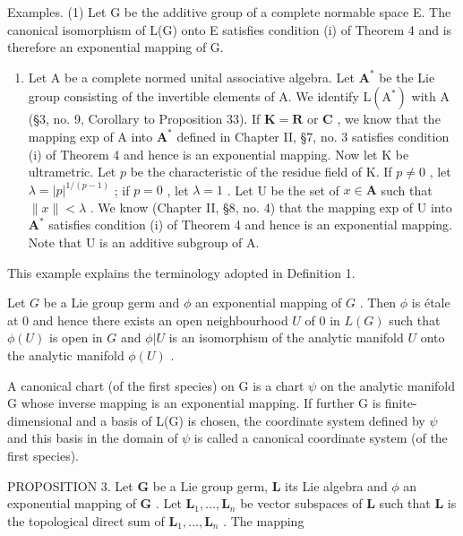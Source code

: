 Examples. (1) Let G be the additive group of a complete normable space E. The canonical isomorphism of L(G) onto E satisfies condition (i) of Theorem 4 and is therefore an exponential mapping of G.

\begin{enumerate}
\def\labelenumi{(\arabic{enumi})}
\setcounter{enumi}{1}
\tightlist
\item
  Let A be a complete normed unital associative algebra. Let \(\mathbf{A}^*\) be the Lie group consisting of the invertible elements of A. We identify \(\mathrm{L}(\mathrm{A}^*)\) with A (§3, no. 9, Corollary to Proposition 33). If \(\mathbf{K} = \mathbf{R}\) or \(\mathbf{C}\) , we know that the mapping exp of A into \(\mathbf{A}^*\) defined in Chapter II, §7, no. 3 satisfies condition (i) of Theorem 4 and hence is an exponential mapping. Now let K be ultrametric. Let \(p\) be the characteristic of the residue field of K. If \(p \neq 0\) , let \(\lambda = |p|^{1/(p-1)}\) ; if \(p = 0\) , let \(\lambda = 1\) . Let U be the set of \(x \in \mathbf{A}\) such that \(\|x\| < \lambda\) . We know (Chapter II, §8, no. 4) that the mapping exp of U into \(\mathbf{A}^*\) satisfies condition (i) of Theorem 4 and hence is an exponential mapping. Note that U is an additive subgroup of A.
\end{enumerate}

This example explains the terminology adopted in Definition 1.

Let \(G\) be a Lie group germ and \(\phi\) an exponential mapping of \(G\) . Then \(\phi\) is étale at 0 and hence there exists an open neighbourhood \(U\) of 0 in \(L(G)\) such that \(\phi(U)\) is open in \(G\) and \(\phi|U\) is an isomorphism of the analytic manifold \(U\) onto the analytic manifold \(\phi(U)\) .

A canonical chart (of the first species) on G is a chart \(\psi\) on the analytic manifold G whose inverse mapping is an exponential mapping. If further G is finite-dimensional and a basis of L(G) is chosen, the coordinate system defined by \(\psi\) and this basis in the domain of \(\psi\) is called a canonical coordinate system (of the first species).

PROPOSITION 3. Let \(\mathbf{G}\) be a Lie group germ, \(\mathbf{L}\) its Lie algebra and \(\phi\) an exponential mapping of \(\mathbf{G}\) . Let \(\mathbf{L}_1, \ldots, \mathbf{L}_n\) be vector subspaces of \(\mathbf{L}\) such that \(\mathbf{L}\) is the topological direct sum of \(\mathbf{L}_1, \ldots, \mathbf{L}_n\) . The mapping

